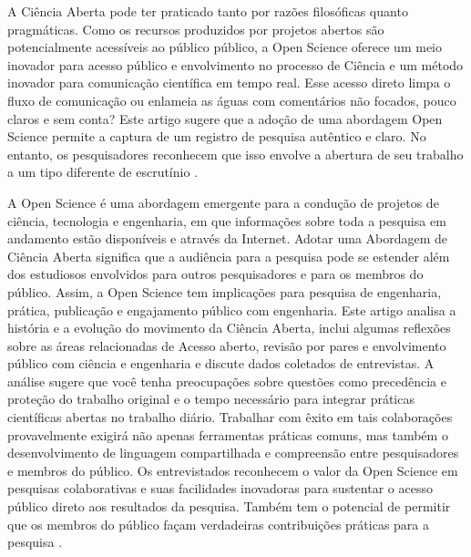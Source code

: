 A Ciência Aberta pode ter praticado tanto por razões filosóficas quanto
pragmáticas. Como os recursos produzidos por projetos abertos são
potencialmente acessíveis ao público público, a Open Science oferece um meio
inovador para acesso público e envolvimento no processo de Ciência e um método
inovador para comunicação científica em tempo real. Esse acesso direto limpa o
fluxo de comunicação ou enlameia as águas com comentários não focados, pouco
claros e sem conta? Este artigo sugere que a adoção de uma abordagem Open
Science permite a captura de um registro de pesquisa autêntico e claro. No
entanto, os pesquisadores reconhecem que isso envolve a abertura de seu
trabalho a um tipo diferente de escrutínio
\cite{grand_open_2010}.

A Open Science é uma abordagem emergente para a condução de projetos de
ciência, tecnologia e engenharia, em que informações sobre toda a pesquisa em
andamento estão disponíveis e através da Internet. Adotar uma Abordagem de
Ciência Aberta significa que a audiência para a pesquisa pode se estender além
dos estudiosos envolvidos para outros pesquisadores e para os membros do
público. Assim, a Open Science tem implicações para pesquisa de engenharia,
prática, publicação e engajamento público com engenharia. Este artigo analisa a
história e a evolução do movimento da Ciência Aberta, inclui algumas reflexões
sobre as áreas relacionadas de Acesso aberto, revisão por pares e envolvimento
público com ciência e engenharia e discute dados coletados de entrevistas. A
análise sugere que você tenha preocupações sobre questões como precedência e
proteção do trabalho original e o tempo necessário para integrar práticas
científicas abertas no trabalho diário. Trabalhar com êxito em tais
colaborações provavelmente exigirá não apenas ferramentas práticas comuns, mas
também o desenvolvimento de linguagem compartilhada e compreensão entre
pesquisadores e membros do público. Os entrevistados reconhecem o valor da Open
Science em pesquisas colaborativas e suas facilidades inovadoras para sustentar
o acesso público direto aos resultados da pesquisa. Também tem o potencial de
permitir que os membros do público façam verdadeiras contribuições práticas
para a pesquisa \cite{grand_open_2010}.


